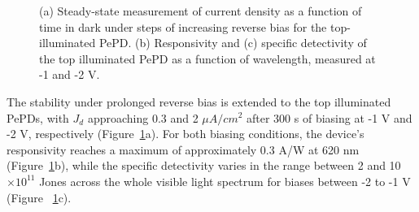 \begin{figure}[htbp]
\begin{subfigure}[t]{0.44\textwidth}
    \end{subfigure}

    \caption[Steady-state current density, responsivity, and specific detectivity of top-illuminated PePD.]{(a) Steady-state measurement of current density as a function of time in dark under steps of increasing reverse bias for the top-illuminated PePD. (b) Responsivity and (c) specific detectivity of the top illuminated PePD as a function of wavelength, measured at -1 and -2 V. }
    \label{fig:etl:top_illuminated_stability_detectivity}
\end{figure}

The stability under prolonged reverse bias is extended to the top illuminated PePDs, with
$J_d$ approaching 0.3 and 2 $\mu A/cm^2$ after 300 s of biasing at -1 V and -2 V, respectively (Figure~\ref{fig:etl:top_illuminated_stability_detectivity}a). For both biasing conditions, the device's responsivity reaches a maximum of approximately 0.3 A/W at 620 nm (Figure~\ref{fig:etl:top_illuminated_stability_detectivity}b), while the specific detectivity varies in the range between 2 and 10 $\times 10^{11}$ Jones across the whole visible light spectrum for biases between -2 to -1 V (Figure ~\ref{fig:etl:top_illuminated_stability_detectivity}c).




